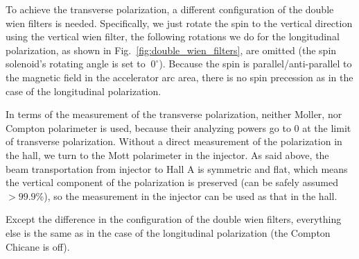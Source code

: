 To achieve the transverse polarization, a different configuration of the double 
wien filters is needed. Specifically, we just rotate the spin to the vertical 
direction using the vertical wien filter, the 
following rotations we do for the longitudinal polarization, as shown in 
Fig.~\ref{fig:double_wien_filters}, are omitted (the spin solenoid's rotating
angle is set to $~0^\circ$). Because the spin is parallel/anti-parallel
to the magnetic field in the accelerator arc area, there is no spin precession as in
the case of the longitudinal polarization. 

In terms of the measurement of the transverse polarization, neither Moller, nor Compton
polarimeter is used, because their analyzing powers go to 0 at the limit of transverse
polarization. Without a direct measurement of the polarization in the hall, 
we turn to the Mott polarimeter in the injector. 
As said above, the beam transportation from injector to Hall A
is symmetric and flat, which means the vertical component of the polarization
is preserved (can be safely assumed $>99.9\%$), so the measurement in the
injector can be used as that in the hall.

Except the difference in the configuration of the double wien filters, everything 
else is the same as in the case of the longitudinal polarization (the Compton Chicane
is off). 

